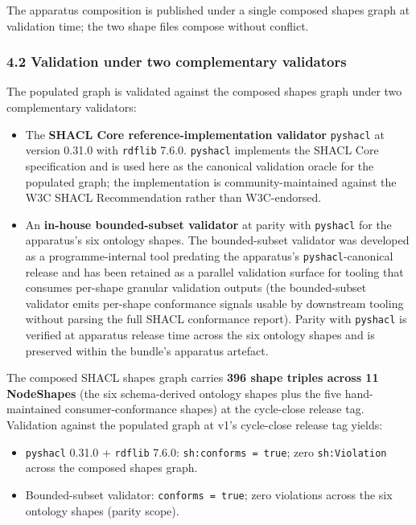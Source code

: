 \documentclass[
]{article}
\providecommand{\tightlist}{%
  \setlength{\itemsep}{0pt}\setlength{\parskip}{0pt}}
\begin{document}
The apparatus composition is published under a single composed shapes
graph at validation time; the two shape files compose without conflict.

\subsubsection{4.2 Validation under two complementary
validators}\label{validation-under-two-complementary-validators}

The populated graph is validated against the composed shapes graph under
two complementary validators:

\begin{itemize}
\tightlist
\item
  The \textbf{SHACL Core reference-implementation validator}
  \texttt{pyshacl} at version 0.31.0 with \texttt{rdflib} 7.6.0.
  \texttt{pyshacl} implements the SHACL Core specification and is used
  here as the canonical validation oracle for the populated graph; the
  implementation is community-maintained against the W3C SHACL
  Recommendation rather than W3C-endorsed.
\item
  An \textbf{in-house bounded-subset validator} at parity with
  \texttt{pyshacl} for the apparatus's six ontology shapes. The
  bounded-subset validator was developed as a programme-internal tool
  predating the apparatus's \texttt{pyshacl}-canonical release and has
  been retained as a parallel validation surface for tooling that
  consumes per-shape granular validation outputs (the bounded-subset
  validator emits per-shape conformance signals usable by downstream
  tooling without parsing the full SHACL conformance report). Parity
  with \texttt{pyshacl} is verified at apparatus release time across the
  six ontology shapes and is preserved within the bundle's apparatus
  artefact.
\end{itemize}

The composed SHACL shapes graph carries \textbf{396 shape triples across
11 NodeShapes} (the six schema-derived ontology shapes plus the five
hand-maintained consumer-conformance shapes) at the cycle-close release
tag. Validation against the populated graph at v1's cycle-close release
tag yields:

\begin{itemize}
\tightlist
\item
  \texttt{pyshacl} 0.31.0 + \texttt{rdflib} 7.6.0:
  \texttt{sh:conforms\ =\ true}; zero \texttt{sh:Violation} across the
  composed shapes graph.
\item
  Bounded-subset validator: \texttt{conforms\ =\ true}; zero violations
  across the six ontology shapes (parity scope).
\end{itemize}
\end{document}
